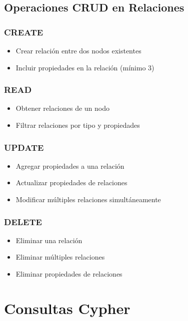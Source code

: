 \documentclass[12pt]{article}
\begin{document}
\subsection{Operaciones CRUD en Relaciones}

\subsubsection{CREATE}
\begin{itemize}
    \item Crear relación entre dos nodos existentes
    \item Incluir propiedades en la relación (mínimo 3)
\end{itemize}

\subsubsection{READ}
\begin{itemize}
    \item Obtener relaciones de un nodo
    \item Filtrar relaciones por tipo y propiedades
\end{itemize}

\subsubsection{UPDATE}
\begin{itemize}
    \item Agregar propiedades a una relación
    \item Actualizar propiedades de relaciones
    \item Modificar múltiples relaciones simultáneamente
\end{itemize}

\subsubsection{DELETE}
\begin{itemize}
    \item Eliminar una relación
    \item Eliminar múltiples relaciones
    \item Eliminar propiedades de relaciones
\end{itemize}

\newpage
\section{Consultas Cypher}
\end{document}
